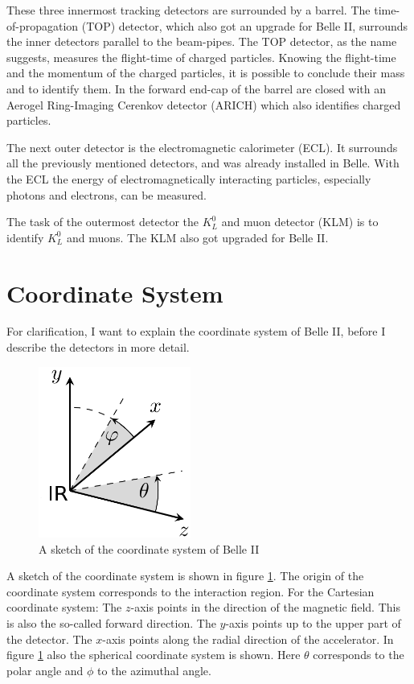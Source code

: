 \documentclass[a4paper,11pt,twosided,final,german,openbib,pdftex,listof=totoc,bibliography=totoc]{scrbook}
\begin{document}
These three innermost tracking detectors are surrounded by a barrel. The time-of-propagation (TOP) detector, which also got an upgrade for Belle II, surrounds the inner detectors parallel to the beam-pipes. The TOP detector, as the name suggests, measures the flight-time of charged particles. Knowing the flight-time and the momentum of the charged particles, it is possible to conclude their mass and to identify them. In the forward end-cap of the barrel are closed with an Aerogel Ring-Imaging Cerenkov detector (ARICH) which also identifies charged particles.

The next outer detector is the electromagnetic calorimeter (ECL). It surrounds all the previously mentioned detectors, and was already installed in Belle. With the ECL the energy of electromagnetically interacting particles, especially photons and electrons, can be measured.

The task of the outermost detector the $K_L^0$ and muon detector (KLM) is to identify $K_L^0$ and muons. The KLM also got upgraded for Belle II. \cite{B2B} 

\section{Coordinate System}

For clarification, I want to explain the coordinate system of Belle II, before I describe the detectors in more detail.

\begin{figure}[h!]
	\begin{center}
		\includegraphics[width=5cm]{Bilder/coordinate.png}
	\end{center}
	\caption[Coordinate System Of Belle II]{A sketch of the coordinate system of Belle II}
	\label{fig:CoordinateSysytem}
\end{figure}

A sketch of the coordinate system is shown in figure \ref{fig:CoordinateSysytem}. The origin of the coordinate system corresponds to the interaction region. For the Cartesian coordinate system: The $z$-axis points in the direction of the magnetic field. This is also the so-called forward direction. The $y$-axis points up to the upper part of the detector. The $x$-axis points along the radial direction of the accelerator. In figure \ref{fig:CoordinateSysytem} also the spherical coordinate system is shown. Here $\theta$ corresponds to the polar angle and $\phi$ to the azimuthal angle.\cite{DevelopVertex}
\end{document}
